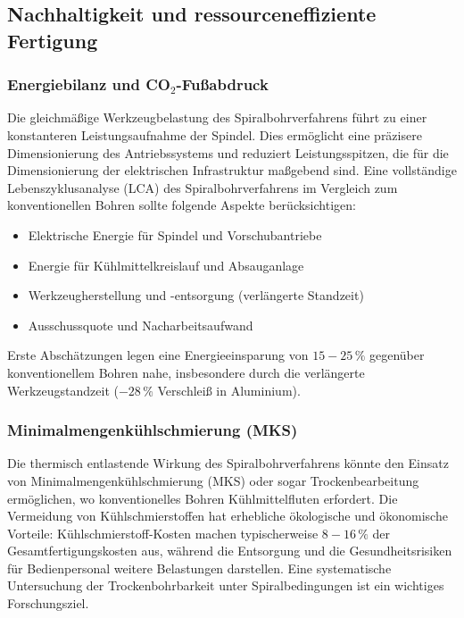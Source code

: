 ﻿\documentclass[12pt,a4paper]{article}
\begin{document}
\subsection{Nachhaltigkeit und ressourceneffiziente Fertigung}

\subsubsection{Energiebilanz und CO$_2$-Fußabdruck}

Die gleichmäßige Werkzeugbelastung des Spiralbohrverfahrens führt zu einer konstanteren Leistungsaufnahme der Spindel. Dies ermöglicht eine präzisere Dimensionierung des Antriebssystems und reduziert Leistungsspitzen, die für die Dimensionierung der elektrischen Infrastruktur maßgebend sind. Eine vollständige Lebenszyklusanalyse (LCA) des Spiralbohrverfahrens im Vergleich zum konventionellen Bohren sollte folgende Aspekte berücksichtigen:
\begin{itemize}
    \item Elektrische Energie für Spindel und Vorschubantriebe
    \item Energie für Kühlmittelkreislauf und Absauganlage
    \item Werkzeugherstellung und -entsorgung (verlängerte Standzeit)
    \item Ausschussquote und Nacharbeitsaufwand
\end{itemize}
Erste Abschätzungen legen eine Energieeinsparung von $15{-}25\,\%$ gegenüber konventionellem Bohren nahe, insbesondere durch die verlängerte Werkzeugstandzeit ($-28\,\%$ Verschleiß in Aluminium).

\subsubsection{Minimalmengenkühlschmierung (MKS)}

Die thermisch entlastende Wirkung des Spiralbohrverfahrens könnte den Einsatz von Minimalmengenkühlschmierung (MKS) oder sogar Trockenbearbeitung ermöglichen, wo konventionelles Bohren Kühlmittelfluten erfordert. Die Vermeidung von Kühlschmierstoffen hat erhebliche ökologische und ökonomische Vorteile: Kühlschmierstoff-Kosten machen typischerweise $8{-}16\,\%$ der Gesamtfertigungskosten aus, während die Entsorgung und die Gesundheitsrisiken für Bedienpersonal weitere Belastungen darstellen. Eine systematische Untersuchung der Trockenbohrbarkeit unter Spiralbedingungen ist ein wichtiges Forschungsziel.
\end{document}
